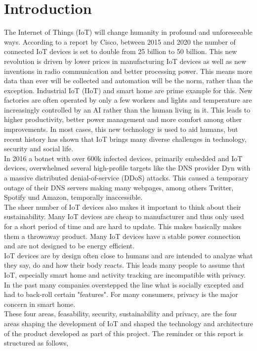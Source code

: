 \section{Introduction}
The Internet of Things (IoT) will change humanity in profound and unforeseeable ways\cite{ciscoReport}. According to a report by Cisco, between 2015 and 2020 the number of connected IoT devices is set to double from 25 billion to 50 billion\cite{ciscoReport}. This new revolution is driven by lower prices in manufacturing IoT devices as well as new inventions in radio communication and better processing power. This means more data than ever will be collected and automation will be the norm, rather than the exception. Industrial IoT (IIoT) and smart home are prime example for this. New factories are often operated by only a few workers and lights and temperature are increasingly controlled by an AI rather than the human living in it. This leads to higher productivity, better power management and more comfort among other improvements. In most cases, this new technology is used to aid humans, but recent history has shown that IoT brings many diverse challenges in technology, security and social life.\\
In 2016 a botnet with over 600k infected devices, primarily embedded and IoT devices, overwhelmed several high-profile targets like the DNS provider Dyn with a massive distributed denial-of-service (DDoS) attacks. This caused a temporary outage of their DNS servers making many webpages, among others  Twitter, Spotify und Amazon, temporally inaccessible.\\
The sheer number of IoT devices also makes it important to think about their sustainability. Many IoT devices are cheap to manufacturer and thus only used for a short period of time and are hard to update. This makes basically makes them a throwaway product. Many IoT devices have a stable power connection and are not designed to be energy efficient. \\
IoT devices are by design often close to humans and are intended to analyze what they say, do and how their body reacts. This leads many people to assume that IoT, especially smart home and activity tracking are incompatible with privacy\cite{5Reasons41:online}. In the past many companies overstepped the line what is socially excepted and had to back-roll certain "features"\cite{PrivacyIoT50:online}. For many consumers, privacy is the major concern in smart home\cite{PrivacyIoT50:online}.\\
These four areas, feasability, security, sustainability and privacy, are the four areas shaping the development of IoT and shaped the technology and architecture of the product developed as part of this project. The reminder or this report is structured as follows,  

